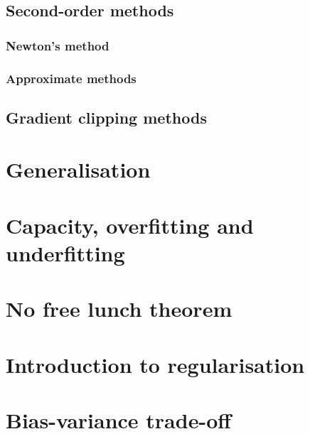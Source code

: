 \subsection{Second-order methods}

\subsubsection{Newton's method}

\subsubsection{Approximate methods}


\subsection{Gradient clipping methods}


\section{Generalisation}


\section{Capacity, overfitting and underfitting}



\section{No free lunch theorem}


\section{Introduction to regularisation}


\section{Bias-variance trade-off}







